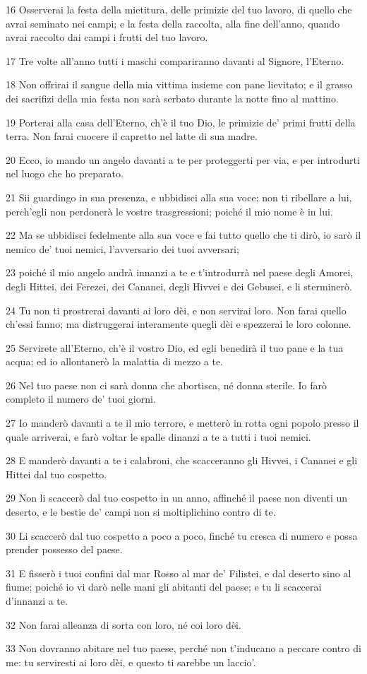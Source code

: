 \par 16 Osserverai la festa della mietitura, delle primizie del tuo lavoro, di quello che avrai seminato nei campi; e la festa della raccolta, alla fine dell'anno, quando avrai raccolto dai campi i frutti del tuo lavoro.
\par 17 Tre volte all'anno tutti i maschi compariranno davanti al Signore, l'Eterno.
\par 18 Non offrirai il sangue della mia vittima insieme con pane lievitato; e il grasso dei sacrifizi della mia festa non sarà serbato durante la notte fino al mattino.
\par 19 Porterai alla casa dell'Eterno, ch'è il tuo Dio, le primizie de' primi frutti della terra. Non farai cuocere il capretto nel latte di sua madre.
\par 20 Ecco, io mando un angelo davanti a te per proteggerti per via, e per introdurti nel luogo che ho preparato.
\par 21 Sii guardingo in sua presenza, e ubbidisci alla sua voce; non ti ribellare a lui, perch'egli non perdonerà le vostre trasgressioni; poiché il mio nome è in lui.
\par 22 Ma se ubbidisci fedelmente alla sua voce e fai tutto quello che ti dirò, io sarò il nemico de' tuoi nemici, l'avversario dei tuoi avversari;
\par 23 poiché il mio angelo andrà innanzi a te e t'introdurrà nel paese degli Amorei, degli Hittei, dei Ferezei, dei Cananei, degli Hivvei e dei Gebusei, e li sterminerò.
\par 24 Tu non ti prostrerai davanti ai loro dèi, e non servirai loro. Non farai quello ch'essi fanno; ma distruggerai interamente quegli dèi e spezzerai le loro colonne.
\par 25 Servirete all'Eterno, ch'è il vostro Dio, ed egli benedirà il tuo pane e la tua acqua; ed io allontanerò la malattia di mezzo a te.
\par 26 Nel tuo paese non ci sarà donna che abortisca, né donna sterile. Io farò completo il numero de' tuoi giorni.
\par 27 Io manderò davanti a te il mio terrore, e metterò in rotta ogni popolo presso il quale arriverai, e farò voltar le spalle dinanzi a te a tutti i tuoi nemici.
\par 28 E manderò davanti a te i calabroni, che scacceranno gli Hivvei, i Cananei e gli Hittei dal tuo cospetto.
\par 29 Non li scaccerò dal tuo cospetto in un anno, affinché il paese non diventi un deserto, e le bestie de' campi non si moltiplichino contro di te.
\par 30 Li scaccerò dal tuo cospetto a poco a poco, finché tu cresca di numero e possa prender possesso del paese.
\par 31 E fisserò i tuoi confini dal mar Rosso al mar de' Filistei, e dal deserto sino al fiume; poiché io vi darò nelle mani gli abitanti del paese; e tu li scaccerai d'innanzi a te.
\par 32 Non farai alleanza di sorta con loro, né coi loro dèi.
\par 33 Non dovranno abitare nel tuo paese, perché non t'inducano a peccare contro di me: tu serviresti ai loro dèi, e questo ti sarebbe un laccio'.

